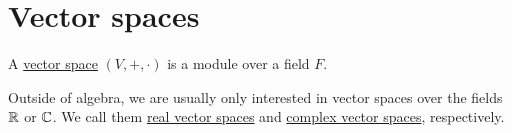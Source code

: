\section{Vector spaces}\label{sec:vector_spaces}

\begin{definition}\label{def:vector_space}
  A \uline{vector space} $(V, +, \cdot)$ is a module over a field $F$.
\end{definition}

\begin{note}\label{note:real_vector_space}
  Outside of algebra, we are usually only interested in vector spaces over the fields $\mathbb R$ or $\mathbb C$. We call them \uline{real vector spaces} and \uline{complex vector spaces}, respectively.
\end{note}
